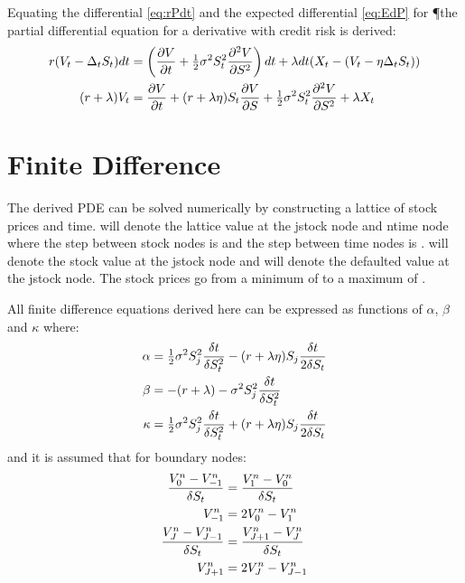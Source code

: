 \documentclass[a4paper,11pt,oneside]{report}
\theoremstyle{plain}
\theoremstyle{definition}
\begin{document}
Equating the differential \eqref{eq:rPdt} and the expected differential \eqref{eq:EdP} for \P the partial differential equation for a derivative with credit risk is derived:
\begin{align}
 r(V_t - \Delta_tS_t)dt &= \left(\frac{\partial V}{\partial t} + \tfrac{1}{2}\sigma^2S_t^2\frac{\partial^2 V}{\partial S^2}\right)dt + \lambda dt(X_t - (V_t - \eta\Delta_tS_t)) \nonumber\\
 (r + \lambda)V_t &= \frac{\partial V}{\partial t} + (r + \lambda\eta)S_t\frac{\partial V}{\partial S} + \tfrac{1}{2}\sigma^2S_t^2\frac{\partial^2 V}{\partial S^2} + \lambda X_t
\end{align}


\section{Finite Difference}
The derived PDE can be solved numerically by constructing a lattice of stock prices and time.  \Vjn will denote the lattice value at the j\th stock node and n\th time node where the step between stock nodes is \DS and the step between time nodes is \Dt.  \Sj will denote the stock value at the j\th stock node and \Xj will denote the defaulted value at the j\th stock node.  The stock prices go from a minimum of \Sz to a maximum of \SJ.

All finite difference equations derived here can be expressed as functions of $\alpha$, $\beta$ and $\kappa$ where:
\begin{align*}
 \alpha &= \tfrac{1}{2}\sigma^2S_j^2\frac{\delta t}{\delta S_t^2} - (r + \lambda\eta)S_j\frac{\delta t}{2\delta S_t} \\
 \beta  &= - (r + \lambda) - \sigma^2S_j^2\frac{\delta t}{\delta S_t^2} \\
 \kappa &= \tfrac{1}{2}\sigma^2S_j^2\frac{\delta t}{\delta S_t^2} + (r + \lambda\eta)S_j\frac{\delta t}{2\delta S_t} \\
\end{align*}
and it is assumed that for boundary nodes:
\begin{align*}
 \frac{V^{n}_{0} - V^{n}_{-1}}{\delta S_t} &= \frac{V^{n}_{1} - V^{n}_{0}}{\delta S_t} \\
                    V^{n}_{-1} &= 2V^{n}_{0} - V^{n}_{1} \\
 \frac{V^{n}_{J} - V^{n}_{J - 1}}{\delta S_t} &= \frac{V^{n}_{J + 1} - V^{n}_{J}}{\delta S_t} \\
                    V^{n}_{J + 1} &= 2V^{n}_{J} - V^{n}_{J - 1} \\
\end{align*}

\end{document}
